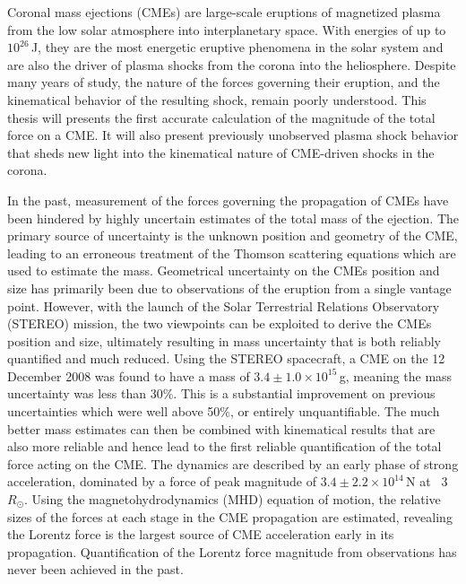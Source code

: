 
\begin{abstracts} 

Coronal mass ejections (CMEs) are large-scale eruptions of magnetized plasma from the low solar atmosphere into interplanetary space. With energies of up to $10^{26}$\,J, they are the most energetic eruptive phenomena in the solar system and are also the driver of plasma shocks from the corona into the heliosphere. Despite many years of study, the nature of the forces governing their eruption, and the kinematical behavior of the resulting shock, remain poorly understood. This thesis will presents the first accurate calculation of the magnitude of the total force on a CME. It will also present previously unobserved plasma shock behavior that sheds new light into the kinematical nature of CME-driven shocks in the corona.

In the past, measurement of the forces governing the propagation of CMEs have been hindered by highly uncertain estimates of the total mass of the ejection. The primary source of uncertainty is the unknown position and geometry of the CME, leading to an erroneous treatment of the Thomson scattering equations which are used to estimate the mass. Geometrical uncertainty on the CMEs position and size has primarily been due to observations of the eruption from a single vantage point. However, with the launch of the Solar Terrestrial Relations Observatory (STEREO) mission, the two viewpoints can be exploited to derive the CMEs position and size, ultimately resulting in mass uncertainty that is both reliably quantified and much reduced. Using the STEREO spacecraft, a CME on the 12 December 2008 was found to have a mass of $3.4\pm1.0\times10^{15}$\,g, meaning the mass uncertainty was less than 30\%. This is a substantial improvement on previous uncertainties which were well above 50\%, or entirely unquantifiable. The much better mass estimates can then be combined with kinematical results that are also more reliable and hence lead to the first reliable quantification of the total force acting on the CME. The dynamics are described by an early phase of strong acceleration, dominated by a force of peak magnitude of $3.4\pm2.2\times10^{14}$\,N at ~3\,$R_{\odot}$. Using the magnetohydrodynamics (MHD) equation of motion, the relative sizes of the forces at each stage in the CME propagation are estimated, revealing the Lorentz force is the largest source of CME acceleration early in its propagation. Quantification of the Lorentz force magnitude from observations has never been achieved in the past.



\end{abstracts}
